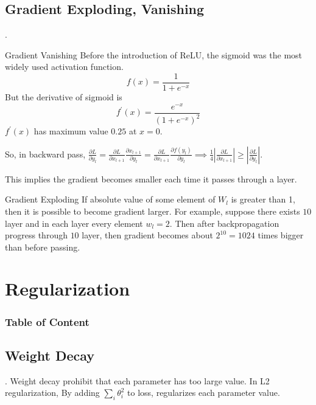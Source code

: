 \documentclass[8pt]{beamer}
\newcommand{\abs}[1]{\left\lvert #1 \right\rvert}
\begin{document}
\subsection{Gradient Exploding, Vanishing}
\begin{frame}{.}

    \begin{block}{Gradient Vanishing}
        Before the introduction of ReLU, the sigmoid was the most widely used activation function.
        \[
            f(x) = \frac{1}{1 + e^{-x}}
        \]
        But the derivative of sigmoid is 
        \[
            f^\prime(x) = \frac{e^{-x}}{(1+ e^{-x})^2}
        \]
        $f^\prime(x)$ has maximum value $0.25$ at $x=0$.

        So, in backward pass, $\frac{\partial L}{\partial y_l} = \frac{\partial L}{\partial x_{l+1}}\frac{\partial x_{l+1}}{\partial y_l} = \frac{\partial L}{\partial x_{l+1}}\frac{\partial f(y_l)}{\partial y_l} \implies \frac{1}{4}\abs{\frac{\partial L}{\partial x_{l+1}}} \geq \abs{\frac{\partial L}{\partial y_l}}$.

        This implies the gradient becomes smaller each time it passes through a layer.
    \end{block}

    \begin{block}{Gradient Exploding}
        If absolute value of some element of $W_l$ is greater than 1, then it is possible to become gradient larger. For example, suppose there exists $10$ layer and in each layer every element $w_l = 2$. Then after backpropagation progress through $10$ layer, then gradient becomes about $2^{10} = 1024$ times bigger than before passing.
    \end{block}

\end{frame}

\section{Regularization}
\begingroup
    \begin{frame}
        \frametitle{Table of Content}
        \tableofcontents
    \end{frame}
\endgroup

\subsection{Weight Decay}
\begin{frame}{.}
    Weight decay prohibit that each parameter has too large value.
    In L2 regularization, By adding $\sum_i \theta_i^2$ to loss, regularizes each parameter value.
\end{frame}
\end{document}
